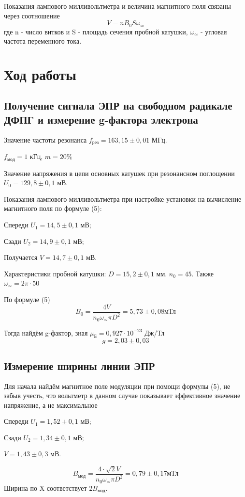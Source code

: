 \documentclass[a4paper,12pt]{article}
\begin{document}
Показания лампового милливольтметра и величина магнитного поля связаны через соотношение
\begin{equation}
V = n B_0 S \omega_\simeq
\end{equation}
где n - число витков и S - площадь сечения пробной катушки, $\omega_\simeq$ - угловая частота переменного тока.

\section{Ход работы}
\subsection*{Получение сигнала ЭПР на свободном радикале ДФПГ и измерение g-фактора электрона}
Значение частоты резонанса $f_\text{рез} = 163,15 \pm 0,01$ МГц.

$f_\text{мод} = 1$ кГц, $m = 20\%$

Значение напряжения в цепи основных катушек при резонансном поглощении $U_0 = 129,8 \pm 0,1$ мВ.

Показания лампового милливольтметра при настройке установки на вычисление магнитного поля по формуле (5):

Спереди $U_1 = 14,5 \pm 0,1$ мВ;

Сзади $U_2 = 14,9 \pm 0,1$ мВ;

Получается $V = 14,7 \pm 0,1$ мВ.

Характеристики пробной катушки: $D = 15,2 \pm 0,1$ мм. $n_0 = 45$. Также $\omega_\simeq = 2 \pi \cdot 50$

По формуле (5)
\[B_0 = \frac{4V}{n_0 \omega_\simeq \pi D^2} = 5,73 \pm 0,08 \text{мТл}\]

Тогда найдём g-фактор, зная $\mu_\text{Б} = 0,927 \cdot 10^{-23}$ Дж/Тл
\[g = 2,03 \pm 0,03\]

\subsection*{Измерение ширины линии ЭПР}
Для начала найдём магнитное поле модуляции при помощи формулы (5), не забыв учесть, что вольтметр в данном случае показывает эффективное значение напряжение, а не максимальное

Спереди $U_1 = 1,52 \pm 0,1$ мВ;

Сзади $U_2 = 1,34 \pm 0,1$ мВ;

$V = 1,43 \pm 0,3$ мВ.

\[B_\text{мод} = \frac{4 \cdot \sqrt{2}V}{n_0 \omega_\simeq \pi D^2} = 0,79 \pm 0,17 \text{мТл}\]
Ширина по X соответствует $2B_\text{мод}$.
\end{document}
